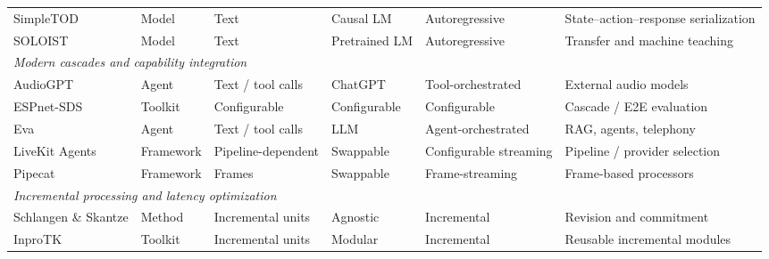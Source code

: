 \begin{table}[t]
{\begin{tabular}{l|l|l|l|l|l}
        SimpleTOD \citep{DBLP:conf/nips/Hosseini-AslMWY20}
        & Model
        & Text
        & Causal LM
        & Autoregressive
        & State--action--response serialization \\

        SOLOIST \citep{DBLP:journals/tacl/PengLLSLG21}
        & Model
        & Text
        & Pretrained LM
        & Autoregressive
        & Transfer and machine teaching \\

        \midrule
        \multicolumn{6}{l}{
            \textit{Modern cascades and capability integration}
        } \\
        \midrule

        AudioGPT \citep{DBLP:conf/aaai/HuangLYSCYWHHLR24}
        & Agent
        & Text / tool calls
        & ChatGPT
        & Tool-orchestrated
        & External audio models \\

        ESPnet-SDS \citep{DBLP:conf/naacl/Arora0STCBFKTSS25}
        & Toolkit
        & Configurable
        & Configurable
        & Configurable
        & Cascade / E2E evaluation \\

        Eva \citep{DBLP:conf/ifaamas/QinZ25}
        & Agent
        & Text / tool calls
        & LLM
        & Agent-orchestrated
        & RAG, agents, telephony \\

        LiveKit Agents \citep{livekitagentsdocs}
        & Framework
        & Pipeline-dependent
        & Swappable
        & Configurable streaming
        & Pipeline / provider selection \\

        Pipecat \citep{pipecatdocs}
        & Framework
        & Frames
        & Swappable
        & Frame-streaming
        & Frame-based processors \\

        \midrule
        \multicolumn{6}{l}{
            \textit{Incremental processing and latency optimization}
        } \\
        \midrule

        Schlangen \& Skantze \citep{DBLP:journals/dad/SchlangenS11}
        & Method
        & Incremental units
        & Agnostic
        & Incremental
        & Revision and commitment \\

        InproTK \citep{DBLP:conf/naacl/BaumannS12}
        & Toolkit
        & Incremental units
        & Modular
        & Incremental
        & Reusable incremental modules \\


\end{tabular}}
\end{table}
